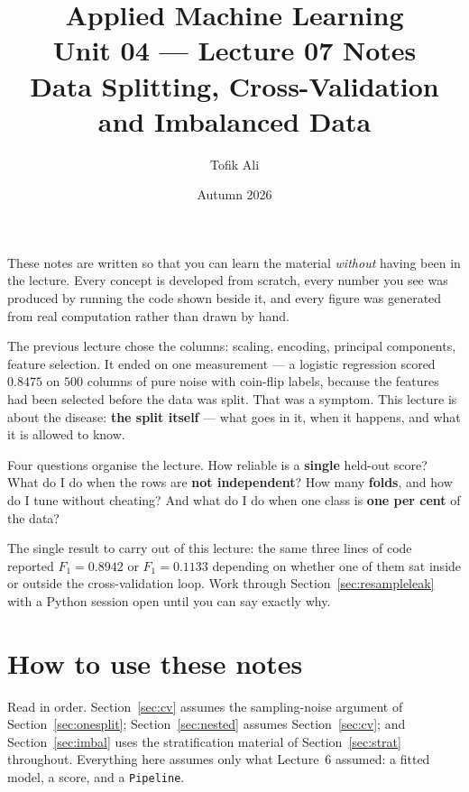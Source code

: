 \documentclass[11pt]{article}
\title{Applied Machine Learning\\Unit 04 --- Lecture 07 Notes\\
       Data Splitting, Cross-Validation and Imbalanced Data}
\author{Tofik Ali}
\date{Autumn 2026}
\begin{document}
\maketitle

\begin{keyidea}
These notes are written so that you can learn the material \emph{without}
having been in the lecture. Every concept is developed from scratch, every
number you see was produced by running the code shown beside it, and every
figure was generated from real computation rather than drawn by hand.

The previous lecture chose the columns: scaling, encoding, principal
components, feature selection. It ended on one measurement --- a logistic
regression scored $0.8475$ on $500$ columns of pure noise with coin-flip
labels, because the features had been selected before the data was split.
That was a symptom. This lecture is about the disease: \textbf{the split
itself} --- what goes in it, when it happens, and what it is allowed to know.

Four questions organise the lecture. How reliable is a \textbf{single}
held-out score? What do I do when the rows are \textbf{not independent}? How
many \textbf{folds}, and how do I tune without cheating? And what do I do when
one class is \textbf{one per cent} of the data?

The single result to carry out of this lecture: the same three lines of code
reported $F_1 = \mathbf{0.8942}$ or $F_1 = \mathbf{0.1133}$ depending on
whether one of them sat inside or outside the cross-validation loop. Work
through Section~\ref{sec:resampleleak} with a Python session open until you
can say exactly why.
\end{keyidea}

\tableofcontents
\medskip

\section{How to use these notes}
\label{sec:how}

Read in order. Section~\ref{sec:cv} assumes the sampling-noise argument of
Section~\ref{sec:onesplit}; Section~\ref{sec:nested} assumes
Section~\ref{sec:cv}; and Section~\ref{sec:imbal} uses the stratification
material of Section~\ref{sec:strat} throughout. Everything here assumes only
what Lecture~6 assumed: a fitted model, a score, and a \texttt{Pipeline}.
\end{document}
